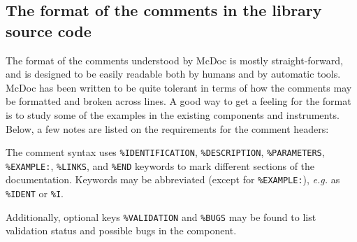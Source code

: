\subsection{The format of the comments in the library source code}

The format of the comments understood by McDoc is mostly
straight-forward, and is designed to be easily readable both by humans
and by automatic tools. McDoc has been written to be quite tolerant in
terms of how the comments may be formatted and broken across lines. A
good way to get a feeling for the format is to study some of the examples
in the existing components and instruments. Below, a few
notes are listed on the requirements for the comment headers:

The comment syntax uses \verb+%IDENTIFICATION+, \verb+%DESCRIPTION+,
\verb+%PARAMETERS+, \verb+%EXAMPLE:+, \verb+%LINKS+, and \verb+%END+
keywords to mark different sections of the documentation. Keywords may
be abbreviated (except for \verb+%EXAMPLE:+), \textit{e.g.} as \verb+%IDENT+ or \verb+%I+.

Additionally, optional keys \verb+%VALIDATION+ and \verb+%BUGS+ may be found to list validation status and possible bugs in the component.

